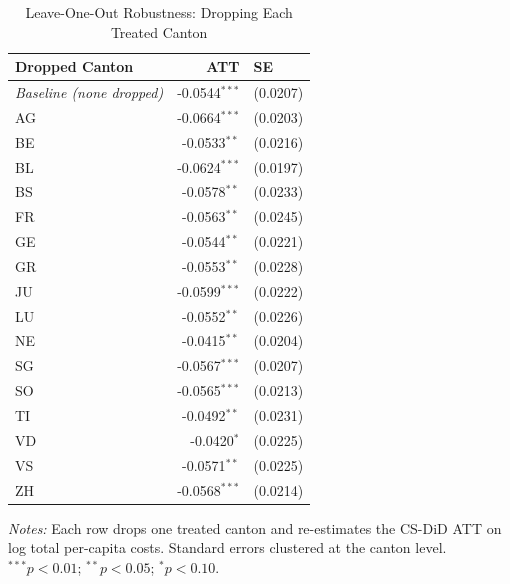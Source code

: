 \begin{table}[t]
\centering
\caption{Leave-One-Out Robustness: Dropping Each Treated Canton}
\label{tab:loo}
\begin{tabular}{lrl}
\hline\hline
Dropped Canton & ATT & SE \\
\hline
\textit{Baseline (none dropped)} & -0.0544$^{***}$ & (0.0207) \\
\addlinespace
AG & -0.0664$^{***}$ & (0.0203) \\
BE & -0.0533$^{**}$ & (0.0216) \\
BL & -0.0624$^{***}$ & (0.0197) \\
BS & -0.0578$^{**}$ & (0.0233) \\
FR & -0.0563$^{**}$ & (0.0245) \\
GE & -0.0544$^{**}$ & (0.0221) \\
GR & -0.0553$^{**}$ & (0.0228) \\
JU & -0.0599$^{***}$ & (0.0222) \\
LU & -0.0552$^{**}$ & (0.0226) \\
NE & -0.0415$^{**}$ & (0.0204) \\
SG & -0.0567$^{***}$ & (0.0207) \\
SO & -0.0565$^{***}$ & (0.0213) \\
TI & -0.0492$^{**}$ & (0.0231) \\
VD & -0.0420$^{*}$ & (0.0225) \\
VS & -0.0571$^{**}$ & (0.0225) \\
ZH & -0.0568$^{***}$ & (0.0214) \\
\hline\hline
\end{tabular}
\begin{tablenotes}
\item \textit{Notes:} Each row drops one treated canton and re-estimates the CS-DiD ATT on log total per-capita costs. Standard errors clustered at the canton level. $^{***}p<0.01$; $^{**}p<0.05$; $^{*}p<0.10$.
\end{tablenotes}
\end{table}

